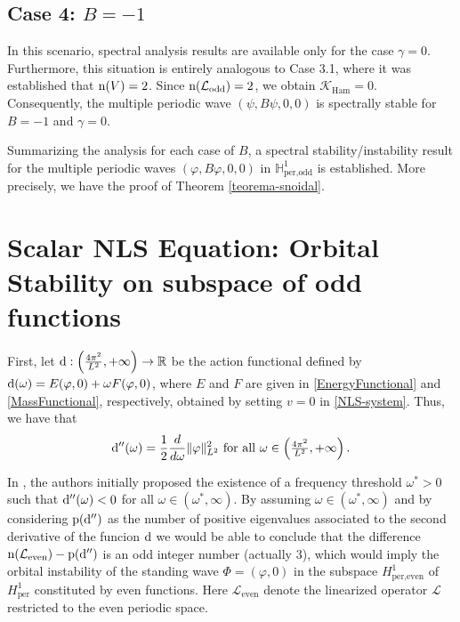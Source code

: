 \documentclass[10pt,reqno,a4paper]{amsart} %
\theoremstyle{definition} %
\numberwithin{equation}{section}
\numberwithin{figure}{section}
\begin{document}
\subsection*{Case 4: $B=-1$} In this scenario, spectral analysis results are available only for the case $\gamma = 0$. Furthermore, this situation is entirely analogous to Case 3.1, where it was established that ${\rm n}(V) = 2$. Since ${\rm n}(\mathcal{L}_{\rm odd}) = 2$, we obtain $\mathcal{K}_{\text{Ham}} = 0$. Consequently, the multiple periodic wave $(\psi, B\psi, 0, 0)$ is spectrally stable for $B = -1$ and $\gamma = 0$.

Summarizing the analysis for each case of $B$, a spectral stability/instability result for the multiple periodic waves $(\varphi, B\varphi, 0, 0)$ in $\mathbb{H}^1_{\text{per,odd}}$ is established. More precisely, we have the proof of Theorem \ref{teorema-snoidal}.

\section{Scalar NLS Equation: Orbital Stability on subspace of odd functions}\label{section-orbital}

First, let ${\rm d}: \left( \tfrac{4\pi^2}{L^2}, +\infty \right) \to \mathbb{R}$ be the action functional defined by ${\rm d}(\omega) = E(\varphi,0) + \omega F(\varphi,0)$, where $E$ and $F$ are given in \eqref{EnergyFunctional} and \eqref{MassFunctional}, respectively, obtained by setting $v = 0$ in \eqref{NLS-system}. Thus, we have that 
$$
{\rm d}''(\omega) = \frac{1}{2} \frac{d}{d\omega} \|\varphi\|_{L^2}^2 \text{ for all } \omega \in \left( \tfrac{4\pi^2}{L^2}, +\infty \right).
$$

In \cite{BittencourtLoreno2022}, the authors initially proposed the existence of a frequency threshold $\omega^*>0$ such that ${\rm d}''(\omega) < 0$ for all $\omega \in (\omega^*,\infty)$.  By assuming $\omega \in (\omega^*,\infty)$ and by considering ${\rm p}({\rm d}'')$ as the number of positive eigenvalues associated to the second derivative of the funcion ${\rm d}$ we would be able to conclude that  the difference ${\rm n}(\mathcal{L}_{\text{even}}) - {\rm p}({\rm d}'')$ is an odd integer number (actually $3$), which would imply the orbital instability of the standing wave $\Phi = (\varphi,0)$ in the subspace $H^1_{\text{per,even}}$ of $H^1_{\text{per}}$  constituted by even functions. Here $\mathcal{L}_{\text{even}}$ denote the linearized operator $\mathcal{L}$ restricted to the even periodic space.
\end{document}
